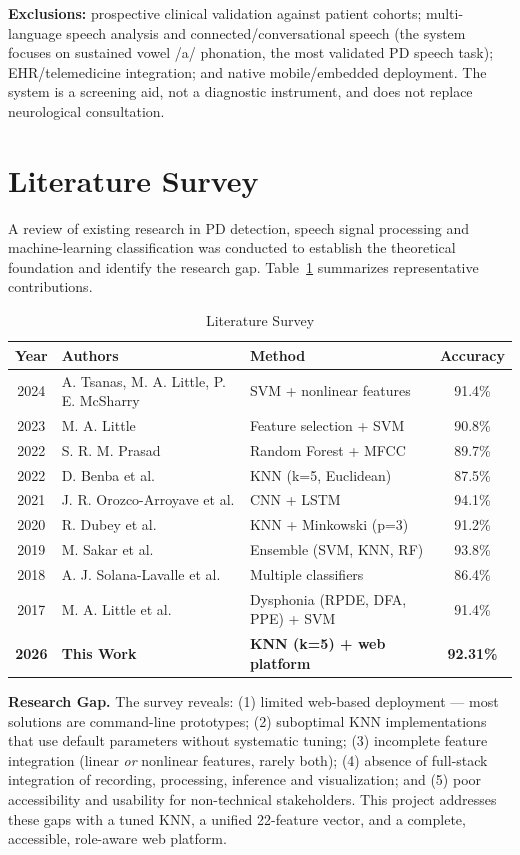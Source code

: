 \documentclass[oneside,a4paper,12pt]{report}
\begin{document}
\textbf{Exclusions:} prospective clinical validation against patient cohorts;
multi-language speech analysis and connected/conversational speech (the system
focuses on sustained vowel /a/ phonation, the most validated PD speech task);
EHR/telemedicine integration; and native mobile/embedded deployment. The system
is a screening aid, not a diagnostic instrument, and does not replace
neurological consultation.

\section{Literature Survey}
A review of existing research in PD detection, speech signal processing and
machine-learning classification was conducted to establish the theoretical
foundation and identify the research gap. Table~\ref{tab:litsurvey} summarizes
representative contributions.

\begin{table}[H]
\centering
\caption{Literature Survey}
\label{tab:litsurvey}
\def\arraystretch{1.3}
\begin{tabularx}{\textwidth}{|c|X|X|c|}
\hline
\textbf{Year} & \textbf{Authors} & \textbf{Method} & \textbf{Accuracy} \\ \hline
2024 & A. Tsanas, M. A. Little, P. E. McSharry & SVM + nonlinear features & 91.4\% \\ \hline
2023 & M. A. Little & Feature selection + SVM & 90.8\% \\ \hline
2022 & S. R. M. Prasad & Random Forest + MFCC & 89.7\% \\ \hline
2022 & D. Benba et al. & KNN (k=5, Euclidean) & 87.5\% \\ \hline
2021 & J. R. Orozco-Arroyave et al. & CNN + LSTM & 94.1\% \\ \hline
2020 & R. Dubey et al. & KNN + Minkowski (p=3) & 91.2\% \\ \hline
2019 & M. Sakar et al. & Ensemble (SVM, KNN, RF) & 93.8\% \\ \hline
2018 & A. J. Solana-Lavalle et al. & Multiple classifiers & 86.4\% \\ \hline
2017 & M. A. Little et al. & Dysphonia (RPDE, DFA, PPE) + SVM & 91.4\% \\ \hline
\textbf{2026} & \textbf{This Work} & \textbf{KNN (k=5) + web platform} & \textbf{92.31\%} \\ \hline
\end{tabularx}
\end{table}

\textbf{Research Gap.} The survey reveals: (1) limited web-based deployment ---
most solutions are command-line prototypes; (2) suboptimal KNN implementations
that use default parameters without systematic tuning; (3) incomplete feature
integration (linear \emph{or} nonlinear features, rarely both); (4) absence of
full-stack integration of recording, processing, inference and visualization;
and (5) poor accessibility and usability for non-technical stakeholders. This
project addresses these gaps with a tuned KNN, a unified 22-feature vector, and a
complete, accessible, role-aware web platform.
\end{document}
